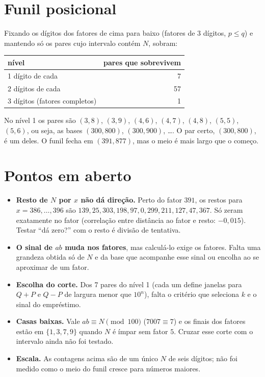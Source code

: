 \documentclass[11pt,a4paper]{article}
\begin{document}
\section{Funil posicional}

Fixando os dígitos dos fatores de cima para baixo (fatores de 3 dígitos, $p\le q$) e mantendo só os pares cujo intervalo contém $N$, sobram:
\begin{center}
\begin{tabular}{lr}
\toprule
nível & pares que sobrevivem \\
\midrule
1 dígito de cada & 7 \\
2 dígitos de cada & 57 \\
3 dígitos (fatores completos) & 1 \\
\bottomrule
\end{tabular}
\end{center}
No nível 1 os pares são $(3,8)$, $(3,9)$, $(4,6)$, $(4,7)$, $(4,8)$, $(5,5)$, $(5,6)$, ou seja, as bases $(300,800)$, $(300,900)$, \ldots. O par certo, $(300,800)$, é um deles. O funil fecha em $(391,877)$, mas o meio é mais largo que o começo.

\section{Pontos em aberto}

\begin{itemize}[leftmargin=1.4em]
  \item \textbf{Resto de $N$ por $x$ não dá direção.} Perto do fator $391$, os restos para $x=386,\dots,396$ são $139,25,303,198,97,0,299,211,127,47,367$. Só zeram exatamente no fator (correlação entre distância ao fator e resto: $-0{,}015$). Testar ``dá zero?'' com o resto é divisão de tentativa.
  \item \textbf{O sinal de $ab$ muda nos fatores}, mas calculá-lo exige os fatores. Falta uma grandeza obtida só de $N$ e da base que acompanhe esse sinal ou encolha ao se aproximar de um fator.
  \item \textbf{Escolha do corte.} Dos 7 pares do nível 1 (cada um define janelas para $Q+P$ e $Q-P$ de largura menor que $10^n$), falta o critério que seleciona $k$ e o sinal do empréstimo.
  \item \textbf{Casas baixas.} Vale $ab\equiv N \pmod{100}$ ($7007\equiv 7$) e os finais dos fatores estão em $\{1,3,7,9\}$ quando $N$ é ímpar sem fator $5$. Cruzar esse corte com o intervalo ainda não foi testado.
  \item \textbf{Escala.} As contagens acima são de um único $N$ de seis dígitos; não foi medido como o meio do funil cresce para números maiores.
\end{itemize}
\end{document}
